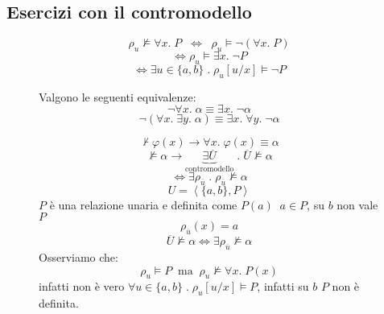 \documentclass{article}
\theoremstyle{break}
\theoremstyle{break}
\theoremstyle{break}
\theoremstyle{break}
\begin{document}
  \subsection{Esercizi con il contromodello}
  \begin{figure}[H]
    \begin{definition}
      \[
        \rho_u \not\models \forall x.\; P \;\; \Leftrightarrow\;\; \rho_u \models \neg (\forall x.\; P)
      \] 
      \[
        \Leftrightarrow \rho_u \models \exists x.\; \neg P
      \] 
      \[
        \Leftrightarrow \exists u \in \{a,b\} \;.\; \rho_u[u/x] \models \neg P
      \] 

      Valgono le seguenti equivalenze:
      \[
        \neg \forall x.\; \alpha \equiv \exists x.\; \neg \alpha
      \] 
      \[
        \neg (\forall x.\; \exists y.\; \alpha) \equiv \exists x.\; \forall y.\; \neg \alpha
      \] 
    \end{definition}
  \end{figure}
  \begin{figure}[H]
    \begin{exercise}
      \[
        \not\vdash \varphi(x) \to \forall x.\; \varphi(x) \equiv \alpha
      \] 
      \[
        \not\models \alpha \to \underbrace{\exists \overline{U}}_{\text{contromodello}} \;.\; \overline{U} \not\models \alpha
      \] 
      \[
        \Leftrightarrow \exists \rho_{\overline{u}} \;.\; \rho_{\overline{u}} \not\models \alpha
      \] 
      \[
        U = \left<\{a,b\}, P\right>
      \] 
      \( P \) è una relazione unaria e definita come \( P(a) \;\; a \in P \), su \( b \) non vale \( P \) 
      \[
        \rho_{\overline{u}}(x) = a
      \] 
      \[
        \overline{U} \not\models \alpha \Leftrightarrow \exists \rho_{\overline{u}} \not\models \alpha
      \] 
      Osserviamo che:
      \[
        \rho_u \models P \;\;\text{ma} \;\; \rho_u \not\models \forall x.\; P(x) 
      \] 
      infatti non è vero \( \forall u \in \{a,b\} \;.\; \rho_u[u/x] \models P \), infatti su \( b \) 
      \( P \) non è definita.
    \end{exercise}
  \end{figure}
\end{document}
